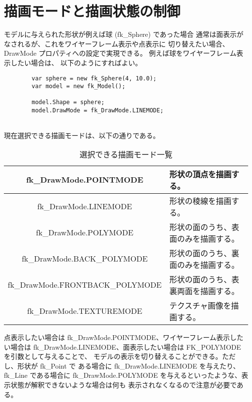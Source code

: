 \section{描画モードと描画状態の制御} \label{sec:drawmode}
モデルに与えられた形状が例えば球 (fk\_Sphere) であった場合
通常は面表示がなされるが、これをワイヤーフレーム表示や点表示に
切り替えたい場合、DrawMode プロパティへの設定で実現できる。
例えば球をワイヤーフレーム表示したい場合は、
以下のようにすればよい。
\\
\begin{breakbox}
\begin{verbatim}
        var sphere = new fk_Sphere(4, 10.0);
        var model = new fk_Model();

        model.Shape = sphere;
        model.DrawMode = fk_DrawMode.LINEMODE;
\end{verbatim}
\end{breakbox}
~ \\
現在選択できる描画モードは、以下の通りである。
\begin{table}[H]
\caption{選択できる描画モード一覧}
\label{tbl:drawmode}
\begin{center}
\begin{tabular}{|c|l|}
\hline
fk\_DrawMode.POINTMODE & 形状の頂点を描画する。\\ \hline
fk\_DrawMode.LINEMODE & 形状の稜線を描画する。\\ \hline
fk\_DrawMode.POLYMODE & 形状の面のうち、表面のみを描画する。\\ \hline
fk\_DrawMode.BACK\_POLYMODE & 形状の面のうち、裏面のみを描画する。\\ \hline
fk\_DrawMode.FRONTBACK\_POLYMODE & 形状の面のうち、表裏両面を描画する。\\ \hline
fk\_DrawMode.TEXTUREMODE & テクスチャ画像を描画する。\\ \hline
\end{tabular}
\end{center}
\end{table}

点表示したい場合は fk\_DrawMode.POINTMODE、ワイヤーフレーム表示したい場合は
fk\_DrawMode.LINEMODE、面表示したい場合は FK\_POLYMODE を引数として与えることで、
モデルの表示を切り替えることができる。ただし、形状が fk\_Point で
ある場合に fk\_DrawMode.LINEMODE を与えたり、
fk\_Line である場合に fk\_DrawMode.POLYMODE
を与えるといったような、表示状態が解釈できないような場合は何も
表示されなくなるので注意が必要である。

